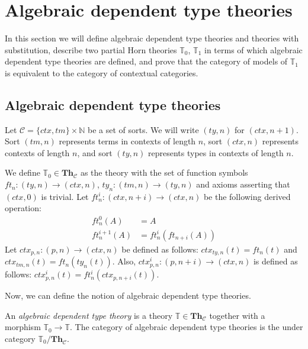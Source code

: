 \documentclass[reqno]{amsart}
\theoremstyle{definition}
\theoremstyle{remark}
\newcommand{\cat}[1]{\mathbf{#1}}
\newcommand{\Th}{\cat{Th}}
\newcommand{\ThC}{\Th_{\mathcal{C}}}
\numberwithin{figure}{section}
\begin{document}
\section{Algebraic dependent type theories}
\label{sec:T1}

In this section we will define algebraic dependent type theories and theories with substitution, describe two partial Horn theories $\mathbb{T}_0$, $\mathbb{T}_1$
    in terms of which algebraic dependent type theories are defined, and prove that the category of models of $\mathbb{T}_1$ is equivalent to the category of contextual categories.

\subsection{Algebraic dependent type theories}

Let $\mathcal{C} = \{ ctx, tm \} \times \mathbb{N}$ be a set of sorts.
We will write $(ty,n)$ for $(ctx,n+1)$.
Sort $(tm,n)$ represents terms in contexts of length $n$, sort $(ctx,n)$ represents contexts of length $n$, and sort $(ty,n)$ represents types in contexts of length $n$.

We define $\mathbb{T}_0 \in \ThC$ as the theory with the set of function symbols $ft_n : (ty,n) \to (ctx,n)$, $ty_n : (tm,n) \to (ty,n)$ and axioms asserting that $(ctx,0)$ is trivial.
Let $ft^i_n : (ctx,n+i) \to (ctx,n)$ be the following derived operation:
\begin{align*}
ft^0_n(A) & = A \\
ft^{i+1}_n(A) & = ft^i_n(ft_{n+i}(A))
\end{align*}
Let $ctx_{p,n} : (p,n) \to (ctx,n)$ be defined as follows: $ctx_{ty,n}(t) = ft_n(t)$ and $ctx_{tm,n}(t) = ft_n(ty_n(t))$.
Also, $ctx^i_{p,n} : (p,n+i) \to (ctx,n)$ is defined as follows: $ctx^i_{p,n}(t) = ft^i_n(ctx_{p,n+i}(t))$.

Now, we can define the notion of algebraic dependent type theories.

\begin{defn}
An \emph{algebraic dependent type theory} is a theory $\mathbb{T} \in \ThC$ together with a morphism $\mathbb{T}_0 \to \mathbb{T}$.
The category of algebraic dependent type theories is the under category $\mathbb{T}_0/\ThC$.
\end{defn}
\end{document}
